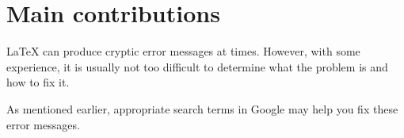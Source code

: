 \chapter{Main contributions}
\label{chap:contributions}

\LaTeX{} can produce cryptic error messages at times.
However, with some experience, it is usually not too
difficult to determine what the problem is and how to fix it.

As mentioned earlier, appropriate search terms in Google
may help you fix these error messages.
